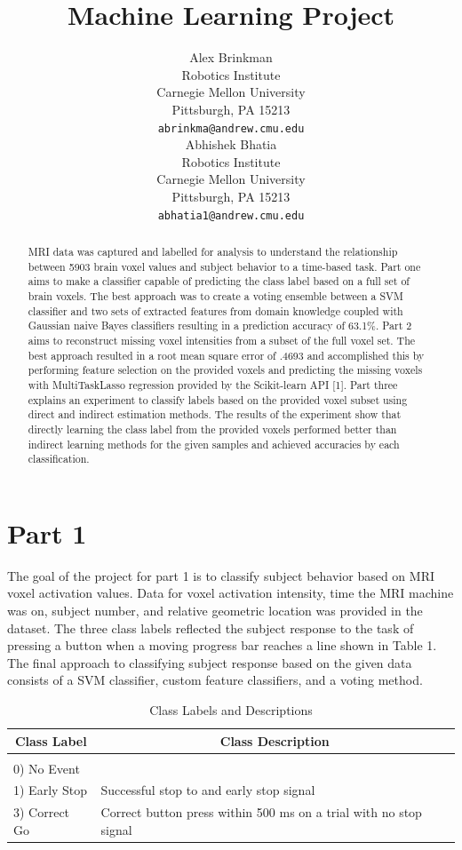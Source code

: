 \documentclass{article} %
\title{Machine Learning Project}
\author{
Alex Brinkman\\
Robotics Institute\\
Carnegie Mellon University\\
Pittsburgh, PA 15213 \\
\texttt{abrinkma@andrew.cmu.edu} \\
\And
Abhishek Bhatia \\
Robotics Institute \\
Carnegie Mellon University\\
Pittsburgh, PA 15213 \\
\texttt{abhatia1@andrew.cmu.edu} \\
}
\begin{document}
\maketitle

\begin{abstract}
MRI data was captured and labelled for analysis to understand the relationship between 5903 brain voxel values and subject behavior to a time-based task. Part one aims to make a classifier capable of predicting the class label based on a full set of brain voxels. The best approach was to create a voting ensemble between a SVM classifier and two sets of extracted features from domain knowledge coupled with Gaussian naive Bayes classifiers resulting in a prediction accuracy of 63.1\%. Part 2 aims to reconstruct missing voxel intensities from a subset of the full voxel set. The best approach resulted in a root mean square error of .4693 and accomplished this by performing feature selection on the provided voxels and predicting the missing voxels with MultiTaskLasso regression provided by the Scikit-learn API [1]. Part three explains an experiment to classify labels based on the provided voxel subset using direct and indirect estimation methods. The results of the experiment show that directly learning the class label from the provided voxels performed better than indirect learning methods for the given samples and achieved accuracies by each classification.

\end{abstract}

\section{Part 1}
The goal of the project for part 1 is to classify subject behavior based on MRI voxel activation values. Data for voxel activation intensity, time the MRI machine was on, subject number, and relative geometric location was provided in the dataset. The three class labels reflected the subject response to the task of pressing a button when a moving progress bar reaches a line shown in Table 1. The final approach to classifying subject response based on the given data consists of a SVM classifier, custom feature classifiers, and a voting method. 

\begin{table}[h]
\caption{Class Labels and Descriptions}
\label{classtable}
\begin{center}
	\begin{tabular}{ll}
		\multicolumn{1}{c}{\bf Class Label}  &\multicolumn{1}{c}{\bf Class Description}
		\\ \hline \\
		0) No Event   &       \\
		1) Early Stop   &Successful stop to and early stop signal \\
		3) Correct Go		&Correct button press within 500 ms on a trial with no stop signal\\
	\end{tabular}
\end{center}
\end{table}  
\end{document}
